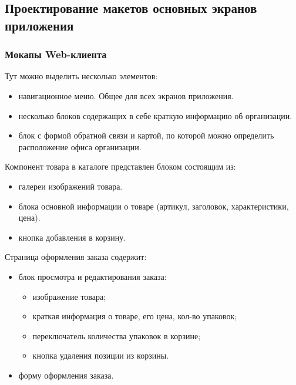 \subsection{Проектирование макетов основных экранов приложения}\label{subsec:2-design-mockups}\indent

\subsubsection{Мокапы Web-клиента}\indent


Тут можно выделить несколько элементов:
\begin{itemize}
    \item навигационное меню. Общее для всех экранов приложения.
    \item несколько блоков содержащих в себе краткую информацию об организации.
    \item блок с формой обратной связи и картой, по которой можно определить расположение офиса организации.
\end{itemize}


Компонент товара в каталоге представлен блоком состоящим из:

\begin{itemize}
    \item галереи изображений товара.
    \item блока основной информации о товаре (артикул, заголовок, характеристики, цена).
    \item кнопка добавления в корзину.
\end{itemize}


Страница оформления заказа содержит:

\begin{itemize}
    \item блок просмотра и редактирования заказа:
    \begin{itemize}
        \item изображение товара;
        \item краткая информация о товаре, его цена, кол-во упаковок;
        \item переключатель количества упаковок в корзине;
        \item кнопка удаления позиции из корзины.
    \end{itemize}
    \item форму оформления заказа.
\end{itemize}

